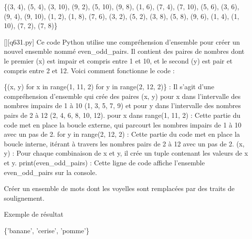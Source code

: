 \{(3, 4), (5, 4), (3, 10), (9, 2), (5, 10), (9, 8), (1, 6), (7, 4), (7, 10), (5, 6), (3, 6), (9, 4), (9, 10), (1, 2), (1, 8), (7, 6), (3, 2), (5, 2), (3, 8), (5, 8), (9, 6), (1, 4), (1, 10), (7, 2), (7, 8)\}
        \par
        \begin{solution}
            \renewcommand{\nomfichier}{q631.py}
            \pythonfile{\chemincode \nomfichier}[][\nomfichier]
            Ce code Python utilise une compréhension d'ensemble pour créer un nouvel ensemble nommé even\_odd\_pairs. Il contient des paires de nombres dont le premier (x) est impair et compris entre 1 et 10, et le second (y) est pair et compris entre 2 et 12. Voici comment fonctionne le code :

    \{(x, y) for x in range(1, 11, 2) for y in range(2, 12, 2)\} : Il s'agit d'une compréhension d'ensemble qui crée des paires (x, y) pour x dans l'intervalle des nombres impairs de 1 à 10 (1, 3, 5, 7, 9) et pour y dans l'intervalle des nombres pairs de 2 à 12 (2, 4, 6, 8, 10, 12).
        pour x dans range(1, 11, 2) : Cette partie du code met en place la boucle externe, qui parcourt les nombres impairs de 1 à 10 avec un pas de 2.
        for y in range(2, 12, 2) : Cette partie du code met en place la boucle interne, itérant à travers les nombres pairs de 2 à 12 avec un pas de 2.
        (x, y) : Pour chaque combinaison de x et y, il crée un tuple contenant les valeurs de x et y.
    print(even\_odd\_pairs) : Cette ligne de code affiche l'ensemble even\_odd\_pairs sur la console.
        \end{solution}
        

        \question
        Créer un ensemble de mots dont les voyelles sont remplacées par des traits de soulignement.

Exemple de résultat

\{'banane', 'cerise', 'pomme'\}

